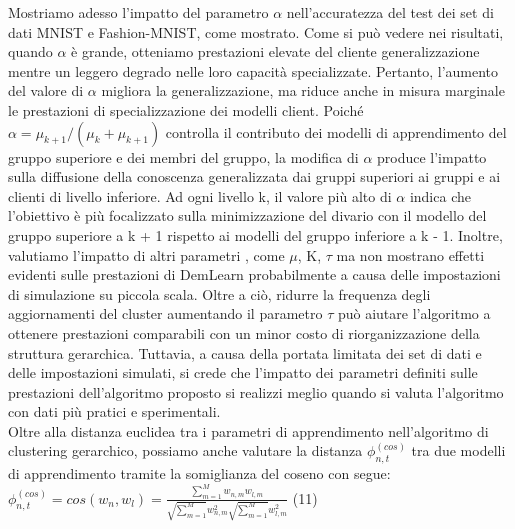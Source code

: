 Mostriamo adesso l'impatto del parametro $\alpha$ nell'accuratezza del test dei set di dati MNIST e Fashion-MNIST, come mostrato. Come si può vedere nei risultati, quando $\alpha$ è grande, otteniamo prestazioni elevate del cliente generalizzazione mentre un leggero degrado nelle loro capacità specializzate.
Pertanto, l'aumento del valore di $\alpha$ migliora la generalizzazione, ma riduce anche in misura marginale le prestazioni di specializzazione dei modelli client. Poiché $\alpha=\mu_{k+1}/(\mu_k+\mu_{k+1})$ controlla il contributo dei modelli di apprendimento del gruppo superiore e dei membri del gruppo, la modifica di $\alpha$ produce l'impatto sulla diffusione della conoscenza generalizzata dai gruppi superiori ai gruppi e ai clienti di livello inferiore. Ad ogni livello k, il valore più alto di $\alpha$ indica che l'obiettivo è più focalizzato sulla minimizzazione del divario con il modello del gruppo superiore a k + 1 rispetto ai modelli del gruppo inferiore a k - 1. Inoltre, valutiamo l'impatto di altri parametri , come $\mu$, K, $\tau$ ma non mostrano effetti evidenti sulle prestazioni di DemLearn probabilmente a causa delle impostazioni di simulazione su piccola scala. Oltre a ciò, ridurre la frequenza degli aggiornamenti del cluster aumentando il parametro $\tau$ può aiutare l'algoritmo a ottenere prestazioni comparabili con un minor costo di riorganizzazione della struttura gerarchica. Tuttavia, a causa della portata limitata dei set di dati e delle impostazioni simulati, si crede che l'impatto dei parametri definiti sulle prestazioni dell'algoritmo proposto si realizzi meglio quando si valuta l'algoritmo con dati più pratici e sperimentali.\\
Oltre alla distanza euclidea tra i parametri di apprendimento nell'algoritmo di clustering gerarchico, possiamo anche valutare la distanza $\phi_{n,t}^{(cos)}$ tra due modelli di apprendimento tramite la somiglianza del coseno con segue: \vspace{0.5cm}\\

$\phi_{n,t}^{(cos)}=cos(w_n,w_l)=\frac{\sum_{m=1}^M w_{n,m}w_{l,m}}{\sqrt{\sum_{m=1}^M}w_{n,m}^2\sqrt{\sum_{m=1}^M}w_{l,m}^2}$ \hfill(11) \vspace{0.5cm}\\

